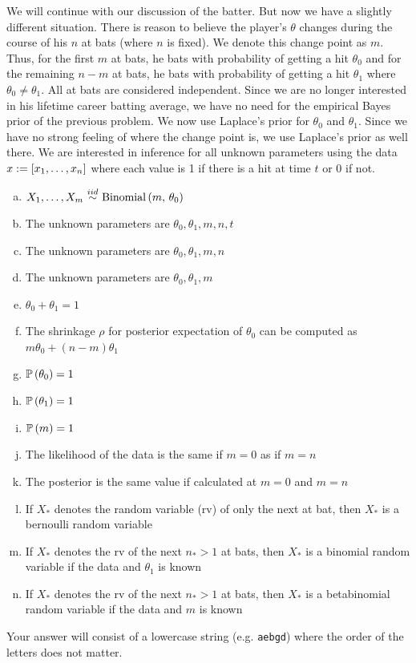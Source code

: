 \documentclass[12pt,landscape]{article}
\newcommand{\instr}{\small Your answer will consist of a lowercase string (e.g. \texttt{aebgd}) where the order of the letters does not matter. \normalsize}
\begin{document}
\problem{} We will continue with our discussion of the batter. But now we have a slightly different situation. There is reason to believe the player's $\theta$ changes during the course of his $n$ at bats (where $n$ is fixed). We denote this change point as $m$. Thus, for the first $m$ at bats, he bats with probability of getting a hit $\theta_0$ and for the remaining $n - m$ at bats, he bats with probability of getting a hit $\theta_1$ where $\theta_0 \neq \theta_1$. All at bats are considered independent. Since we are no longer interested in his lifetime career batting average, we have no need for the empirical Bayes prior of the previous problem. We now use Laplace's prior for $\theta_0$ and $\theta_1$. Since we have no strong feeling of where the change point is, we use Laplace's prior as well there. We are interested in inference for all unknown parameters using the data $x := \left[x_1, \ldots, x_n\right]$ where each value is 1 if there is a hit at time $t$ or 0 if not.

\vspace{-0.2cm}\benum{} 

\begin{enumerate}[(a)]
\item $X_1, \ldots, X_m \iid \binomial{m}{\theta_0}$
\item The unknown parameters are $\theta_0, \theta_1, m, n, t$
\item The unknown parameters are $\theta_0, \theta_1, m, n$
\item The unknown parameters are $\theta_0, \theta_1, m$
\item $\theta_0 + \theta_1 = 1$
\item The shrinkage $\rho$ for posterior expectation of $\theta_0$ can be computed as $m\theta_0 + (n-m)\theta_1$
\item $\mathbb{P}\left(\theta_0\right) = 1$
\item $\mathbb{P}\left(\theta_1\right) = 1$
\item $\mathbb{P}\left(m\right) = 1$
\item The likelihood of the data is the same if $m = 0$ as if $m = n$
\item The posterior is the same value if calculated at $m = 0$ and $m = n$
\item If $X_*$ denotes the random variable (rv) of only the next at bat, then $X_*$ is a bernoulli random variable
\item If $X_*$ denotes the rv of the next $n_* > 1$ at bats, then $X_*$ is a binomial random variable if the data and $\theta_1$ is known
\item If $X_*$ denotes the rv of the next $n_* > 1$ at bats, then $X_*$ is a betabinomial random variable if the data and $m$ is known
\end{enumerate}
\eenum\instr\pagebreak
\end{document}

